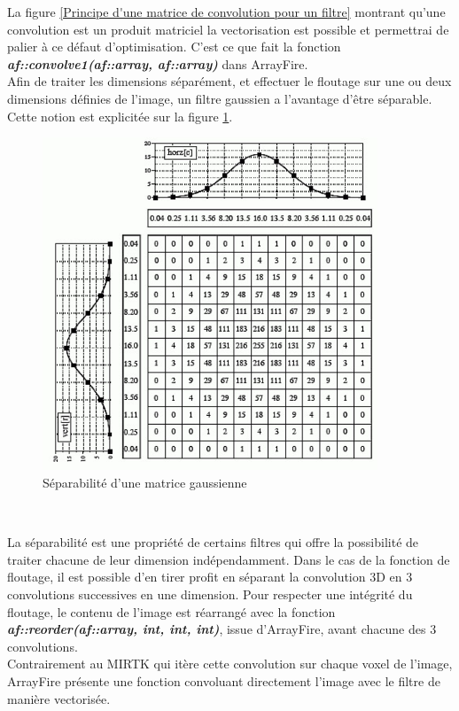 \documentclass[10pt]{report}
\begin{document}
	La figure \ref{Principe d'une matrice de convolution pour un filtre} montrant qu'une convolution est un produit matriciel la vectorisation est possible et permettrai de palier à ce défaut d'optimisation. C'est ce que fait la fonction \textbf{\textit{af::convolve1(af::array, af::array)}} dans ArrayFire.\\
	\newpage
	Afin de traiter les dimensions séparément, et effectuer le floutage sur une ou deux dimensions définies de l'image, un filtre gaussien a l'avantage d'être séparable. Cette notion est explicitée sur la figure \ref{Séparabilité d'une matrice gaussienne}.
	\begin{figure}[h!]
		\begin{center}
			\includegraphics[width=10cm]{gauss_sep.jpg}
		\end{center}
		\caption{Séparabilité d'une matrice gaussienne}
		\label{Séparabilité d'une matrice gaussienne}
	\end{figure} ~\par
	La séparabilité est une propriété de certains filtres qui offre la possibilité de traiter chacune de leur dimension indépendamment. Dans le cas de la fonction de floutage, il est possible d'en tirer profit en séparant la convolution 3D en 3 convolutions successives en une dimension. Pour respecter une intégrité du floutage, le contenu de l'image est réarrangé avec la fonction \textbf{\textit{af::reorder(af::array, int, int, int)}}, issue d'ArrayFire, avant chacune des 3 convolutions.\\

	Contrairement au MIRTK qui itère cette convolution sur chaque voxel de l'image, ArrayFire présente une fonction convoluant directement l'image avec le filtre de manière vectorisée.\\
	
\end{document}
